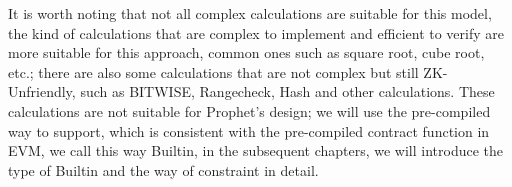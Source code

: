 It is worth noting that not all complex calculations are suitable for this model, the kind of calculations that are complex to implement
and efficient to verify are more suitable for this approach, common ones such as square root, cube root, etc.; there are also some calculations
that are not complex but still ZK-Unfriendly, such as BITWISE, Rangecheck, Hash and other calculations. These calculations are not suitable
for Prophet's design; we will use the pre-compiled way to support, which is consistent with the pre-compiled contract function in EVM, we
call this way Builtin, in the subsequent chapters, we will introduce the type of Builtin and the way of constraint in detail.